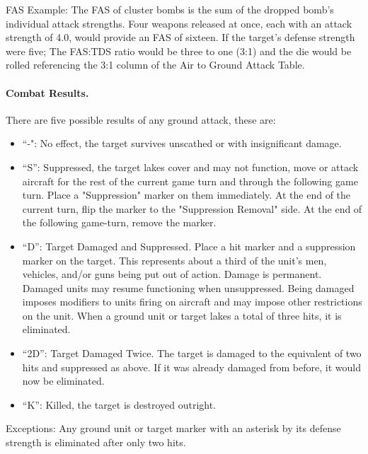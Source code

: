 FAS Example: The FAS of cluster bombs is the sum of the dropped bomb's individual attack strengths. Four weapons released at once, each with an attack strength of 4.0, would provide an FAS of sixteen. If the target's defense strength were five; The FAS:TDS ratio would be three to one (3:1) and the die would be rolled referencing the 3:1 column of the Air to Ground Attack Table.

\paragraph{Combat Results.} There are five possible results of any ground attack, these are:
\begin{itemize}
    \item “-": No effect, the target survives unscathed or with insignificant damage.
    \item “S”: Suppressed, the target lakes cover and may not function, move or attack aircraft for the rest of the current game turn and through the following game turn. Place a "Suppression" marker on them immediately. At the end of the current turn, flip the marker to the "Suppression Removal" side. At the end of the following game-turn, remove the marker.
    \item “D”: Target Damaged and Suppressed. Place a hit marker and a suppression marker on the target. This represents about a third of the unit's men, vehicles, and/or guns being put out of action. Damage is permanent. Damaged units may resume functioning when unsuppressed. Being damaged imposes modifiers to units firing on aircraft and may impose other restrictions on the unit. When a ground unit or target lakes a total of three hits, it is eliminated.
    \item “2D”: Target Damaged Twice. The target is damaged to the equivalent of two hits and suppressed as above. If it was already damaged from before, it would now be eliminated.
    \item “K”: Killed, the target is destroyed outright.
\end{itemize}

Exceptions:  Any ground unit or target marker with an asterisk by its defense strength is eliminated after only two hits.

